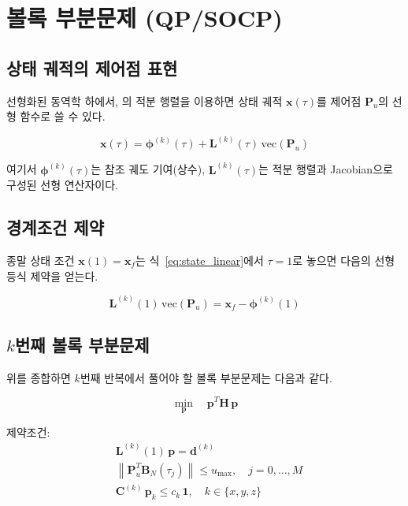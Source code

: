 \documentclass[11pt]{article}
\begin{document}
\section{볼록 부분문제 (QP/SOCP)}

\subsection{상태 궤적의 제어점 표현}

선형화된 동역학 하에서, \cite{report004}의 적분 행렬을 이용하면
상태 궤적 $\mathbf{x}(\tau)$를 제어점 $\mathbf{P}_u$의 선형 함수로 쓸 수 있다.

\begin{equation}
  \mathbf{x}(\tau) = \boldsymbol{\phi}^{(k)}(\tau) + \mathbf{L}^{(k)}(\tau)\,\mathrm{vec}(\mathbf{P}_u)
  \label{eq:state_linear}
\end{equation}

여기서 $\boldsymbol{\phi}^{(k)}(\tau)$는 참조 궤도 기여(상수),
$\mathbf{L}^{(k)}(\tau)$는 적분 행렬과 Jacobian으로 구성된 선형 연산자이다.

\subsection{경계조건 제약}

종말 상태 조건 $\mathbf{x}(1) = \mathbf{x}_f$는 식~\eqref{eq:state_linear}에서 $\tau=1$로
놓으면 다음의 선형 등식 제약을 얻는다.

\begin{equation}
  \mathbf{L}^{(k)}(1)\,\mathrm{vec}(\mathbf{P}_u) = \mathbf{x}_f - \boldsymbol{\phi}^{(k)}(1)
  \label{eq:bc_linear}
\end{equation}

\subsection{$k$번째 볼록 부분문제}

위를 종합하면 $k$번째 반복에서 풀어야 할 볼록 부분문제는 다음과 같다.

\begin{equation}
  \min_{\mathbf{p}}\quad \mathbf{p}^T \mathbf{H}\, \mathbf{p}
  \label{eq:qp}
\end{equation}

제약조건:
\begin{align}
  &\mathbf{L}^{(k)}(1)\,\mathbf{p} = \mathbf{d}^{(k)} \label{eq:qp_eq}\\
  &\left\|\mathbf{P}_u^T \mathbf{B}_N(\tau_j)\right\| \leq u_{\max},\quad j=0,\ldots,M \label{eq:qp_socp}\\
  &\mathbf{C}^{(k)}\,\mathbf{p}_k \leq c_k\,\mathbf{1},\quad k \in \{x,y,z\} \label{eq:qp_ineq}
\end{align}
\end{document}
